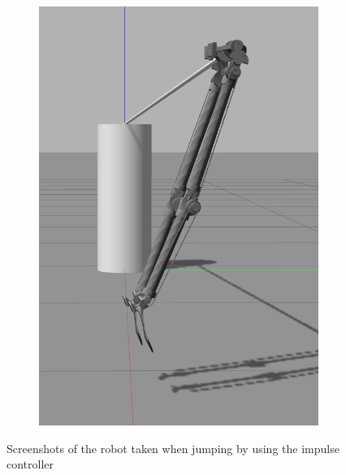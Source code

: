 \begin{figure}[ht!]
\begin{subfigure}[b]{0.16\textwidth}
        \includegraphics[width=\textwidth]{figures/gazebo_jumping_7}
    \end{subfigure}
    \caption{Screenshots of the robot taken when jumping by using the impulse controller}
    \label{fig:gazebo_jumping}
\end{figure}    


